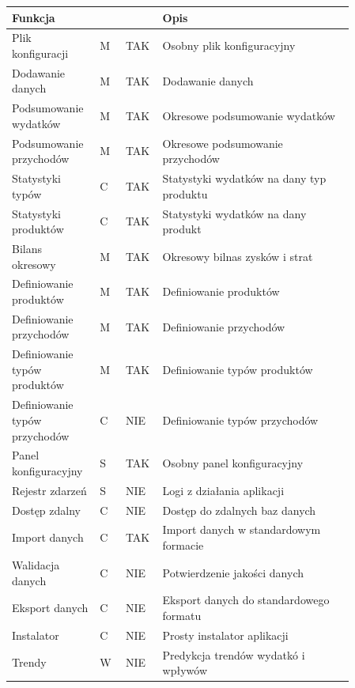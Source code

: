 \documentclass[a4paper,10pt, twoside]{report}
\newcommand{\customstyletable}[1]{\footnotesize{\textbf{#1}}}
\newcommand{\customstyletablecentered}[1]{\footnotesize\centering{\textbf{#1}}}
\begin{document}
\begin{table}[h]
\begin{tabular}{|p{0.2\linewidth}|p{0.07\linewidth}|p{0.07\linewidth}|p{0.52\linewidth}|}
    \customstyletable{Funkcja} & \customstyletablecentered{PRIO} & \customstyletablecentered{IMPL}& \customstyletable{Opis} \\
    \hline
    {Plik konfiguracji} & {M} & {TAK} & {Osobny plik konfiguracyjny}\\
    \hline
    {Dodawanie danych} & {M} & {TAK} & {Dodawanie danych}\\
    \hline
    {Podsumowanie wydatków} & {M} & {TAK} & {Okresowe podsumowanie wydatków}\\
    \hline
    {Podsumowanie przychodów} & {M} & {TAK} & {Okresowe podsumowanie przychodów}\\
    \hline
    {Statystyki typów} & {C} & {TAK} & {Statystyki wydatków na dany typ produktu}\\
    \hline
    {Statystyki produktów} & {C} & {TAK} & {Statystyki wydatków na dany produkt}\\
    \hline
    {Bilans okresowy} & {M} & {TAK} & {Okresowy bilnas zysków i strat}\\
    \hline
    {Definiowanie produktów} & {M} & {TAK} & {Definiowanie produktów}\\
    \hline
    {Definiowanie przychodów} & {M} & {TAK} & {Definiowanie przychodów}\\
    \hline
    {Definiowanie typów produktów} & {M} & {TAK} & {Definiowanie typów produktów}\\
    \hline
    {Definiowanie typów przychodów} & {C} & {NIE} & {Definiowanie typów przychodów}\\
    \hline
    {Panel konfiguracyjny} & {S} & {TAK} & {Osobny panel konfiguracyjny}\\
    \hline
    {Rejestr zdarzeń} & {S} & {NIE} & {Logi z działania aplikacji}\\
    \hline
    {Dostęp zdalny} & {C} & {NIE} & {Dostęp do zdalnych baz danych}\\
    \hline
    {Import danych} & {C} & {TAK} & {Import danych w standardowym formacie}\\
    \hline
    {Walidacja danych} & {C} & {NIE} & {Potwierdzenie jakości danych}\\
    \hline
    {Eksport danych} & {C} & {NIE} & {Eksport danych do standardowego formatu}\\
    \hline
    {Instalator} & {C} & {NIE} & {Prosty instalator aplikacji}\\
    \hline
    {Trendy} & {W} & {NIE} & {Predykcja trendów wydatkó i wpływów}\\

\end{tabular}
\end{table}
\end{document}
